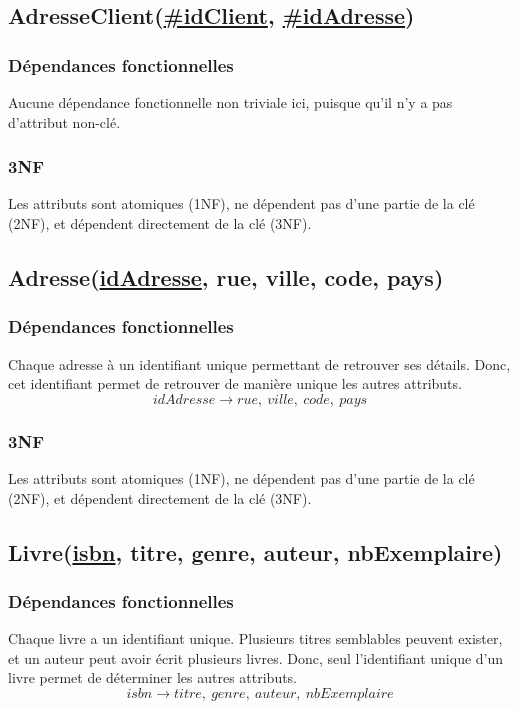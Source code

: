 \documentclass{article}
\begin{document}
\subsection{AdresseClient(\underline{\#idClient}, \underline{\#idAdresse})}
\subsubsection{Dépendances fonctionnelles}
Aucune dépendance fonctionnelle non triviale ici, puisque qu'il n'y a pas d'attribut
non-clé.
\subsubsection{3NF}
Les attributs sont atomiques (1NF), ne dépendent pas d'une partie de la clé
(2NF), et dépendent directement de la clé (3NF).


\subsection{Adresse(\underline{idAdresse}, rue, ville, code, pays)}
\subsubsection{Dépendances fonctionnelles}
Chaque adresse à un identifiant unique permettant de retrouver ses
détails. Donc, cet identifiant permet de retrouver de manière unique les autres
attributs.
$$idAdresse \rightarrow rue, \ ville, \ code, \ pays$$

\subsubsection{3NF}
Les attributs sont atomiques (1NF), ne dépendent pas d'une partie de la clé
(2NF), et dépendent directement de la clé (3NF).


\subsection{Livre(\underline{isbn}, titre, genre, auteur, nbExemplaire)}
\subsubsection{Dépendances fonctionnelles}
Chaque livre a un identifiant unique. Plusieurs titres semblables peuvent
exister, et un auteur peut avoir écrit plusieurs livres. Donc, seul
l'identifiant unique d'un livre permet de déterminer les autres attributs.
$$isbn \rightarrow titre, \ genre, \ auteur, \ nbExemplaire$$
\end{document}
